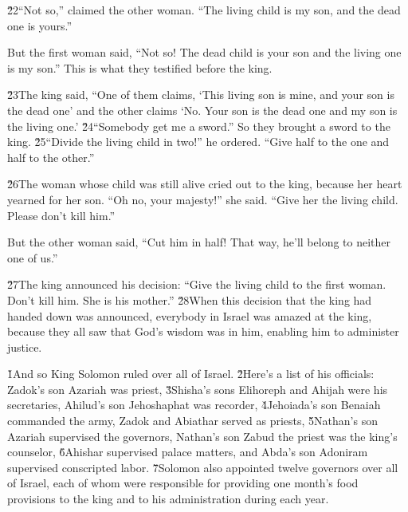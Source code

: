 \v{22}``Not so,'' claimed the other woman. ``The living child is my son, and the dead one is yours.''

But the first woman said, ``Not so! The dead child is your son and the living one is my son.'' This is what they testified before the king.

\v{23}The king said, ``One of them claims, `This living son is mine, and your son is the dead one' and the other claims `No. Your son is the dead one and my son is the living one.' \v{24}``Somebody get me a sword.'' So they brought a sword to the king. \v{25}``Divide the living child in two!'' he ordered. ``Give half to the one and half to the other.''

\v{26}The woman whose child was still alive cried out to the king, because her heart yearned for her son. ``Oh no, your majesty!'' she said. ``Give her the living child. Please don't kill him.''

But the other woman said, ``Cut him in half! That way, he'll belong to neither one of us.''

\v{27}The king announced his decision: ``Give the living child to the first woman. Don't kill him. She is his mother.'' \v{28}When this decision that the king had handed down was announced, everybody in Israel was amazed at the king, because they all saw that God's wisdom was in him, enabling him to administer justice.

\v{1}And so King Solomon ruled over all of Israel. \v{2}Here's a list of his officials: Zadok's son Azariah was priest, \v{3}Shisha's sons Elihoreph and Ahijah were his secretaries, Ahilud's son Jehoshaphat was recorder, \v{4}Jehoiada's son Benaiah commanded the army, Zadok and Abiathar served as priests, \v{5}Nathan's son Azariah supervised the governors, Nathan's son Zabud the priest was the king's counselor, \v{6}Ahishar supervised palace matters, and Abda's son Adoniram supervised conscripted labor. \v{7}Solomon also appointed twelve governors over all of Israel, each of whom were responsible for providing one month's food provisions to the king and to his administration during each year.


